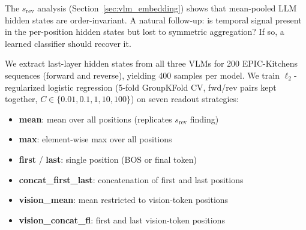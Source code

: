 \documentclass{article}
\theoremstyle{remark}
\begin{document}
The $s_\text{rev}$ analysis (Section~\ref{sec:vlm_embedding}) shows that mean-pooled LLM hidden states are order-invariant. A natural follow-up: is temporal signal present in the per-position hidden states but lost to symmetric aggregation? If so, a learned classifier should recover it.

We extract last-layer hidden states from all three VLMs for 200 EPIC-Kitchens sequences (forward and reverse), yielding 400 samples per model. We train $\ell_2$-regularized logistic regression (5-fold GroupKFold CV, fwd/rev pairs kept together, $C \in \{0.01, 0.1, 1, 10, 100\}$) on seven readout strategies:

\begin{itemize}
    \item \textbf{mean}: mean over all positions (replicates $s_\text{rev}$ finding)
    \item \textbf{max}: element-wise max over all positions
    \item \textbf{first} / \textbf{last}: single position (BOS or final token)
    \item \textbf{concat\_first\_last}: concatenation of first and last positions
    \item \textbf{vision\_mean}: mean restricted to vision-token positions
    \item \textbf{vision\_concat\_fl}: first and last vision-token positions
\end{itemize}

\begin{table}[h]
\centering
\caption{Exploratory probe accuracy (GroupKFold CV, fwd/rev pairs kept together) for forward vs.\ reverse classification from LLM hidden states. Linear reports the best observed $C \in \{0.01, 0.1, 1, 10, 100\}$ on the same CV folds; MLP is a 2-layer network. Chance = 0.500. No nested-CV or held-out selection correction is applied.}
\label{tab:linear_probe}
\end{table}
\end{document}
